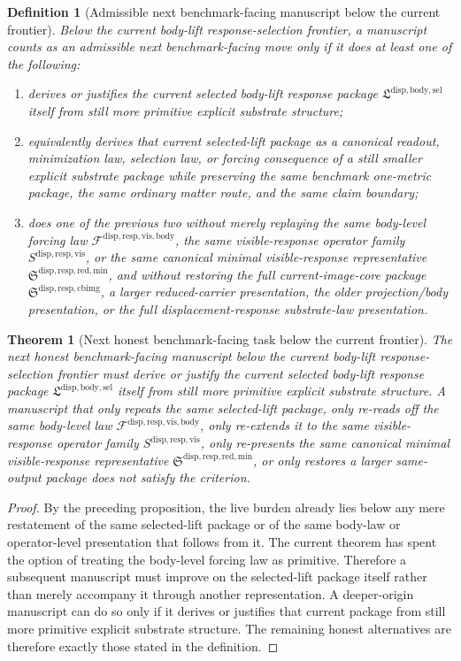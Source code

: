 \documentclass[11pt]{article}
\newcommand{\LiftSelectionPackage}{\mathfrak L^{\mathrm{disp,body,sel}}}
\newcommand{\VisibleBodyForcingLaw}{\mathscr F^{\mathrm{disp,resp,vis,body}}}
\newcommand{\VisibleResponseOperator}{S^{\mathrm{disp,resp,vis}}}
\newcommand{\MinimalReducedStructure}{\mathfrak S^{\mathrm{disp,resp,red,min}}}
\newcommand{\CurrentBodyImageCore}{\mathfrak S^{\mathrm{disp,resp,cbimg}}}
\newtheorem{definition}{Definition}
\newtheorem{theorem}{Theorem}
\begin{document}
\begin{definition}[Admissible next benchmark-facing manuscript below the current frontier]
Below the current body-lift response-selection frontier, a manuscript counts as an admissible next benchmark-facing move only if it does at least one of the following:
\begin{enumerate}
    \item derives or justifies the current selected body-lift response package \(\LiftSelectionPackage\) itself from still more primitive explicit substrate structure;
    \item equivalently derives that current selected-lift package as a canonical readout, minimization law, selection law, or forcing consequence of a still smaller explicit substrate package while preserving the same benchmark one-metric package, the same ordinary matter route, and the same claim boundary;
    \item does one of the previous two without merely replaying the same body-level forcing law \(\VisibleBodyForcingLaw\), the same visible-response operator family \(\VisibleResponseOperator\), or the same canonical minimal visible-response representative \(\MinimalReducedStructure\), and without restoring the full current-image-core package \(\CurrentBodyImageCore\), a larger reduced-carrier presentation, the older projection/body presentation, or the full displacement-response substrate-law presentation.
\end{enumerate}
\end{definition}

\begin{theorem}[Next honest benchmark-facing task below the current frontier]
The next honest benchmark-facing manuscript below the current body-lift response-selection frontier must derive or justify the current selected body-lift response package \(\LiftSelectionPackage\) itself from still more primitive explicit substrate structure. A manuscript that only repeats the same selected-lift package, only re-reads off the same body-level law \(\VisibleBodyForcingLaw\), only re-extends it to the same visible-response operator family \(\VisibleResponseOperator\), only re-presents the same canonical minimal visible-response representative \(\MinimalReducedStructure\), or only restores a larger same-output package does not satisfy the criterion.
\end{theorem}

\begin{proof}
By the preceding proposition, the live burden already lies below any mere restatement of the same selected-lift package or of the same body-law or operator-level presentation that follows from it. The current theorem has spent the option of treating the body-level forcing law as primitive. Therefore a subsequent manuscript must improve on the selected-lift package itself rather than merely accompany it through another representation. A deeper-origin manuscript can do so only if it derives or justifies that current package from still more primitive explicit substrate structure. The remaining honest alternatives are therefore exactly those stated in the definition.
\end{proof}
\end{document}
